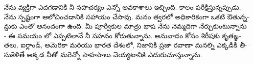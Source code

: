 \documentclass[12pt,varwidth]{standalone}
\begin{document}


\begin{telugu} 


నేను వ్యక్తిగా ఎదగడానికి నీ సహచర్యం ఎన్నో అవకాశాలు ఇచ్చింది. కాలం పరీక్షిస్తున్నప్పుడు, నేను స్పష్టంగా ఆలోచించడానికి సహాయం చేసావు. మనం త్వరలో అధికారికంగా ఒకటి ఔతున్నన్దుకు ఎంతో ఆనందంగా ఉంది. మీ పూర్వీకుల మాత్రు భాష నేను నెమ్మదిగా నేర్చుకుంటున్నాను - ఈ సమయం లో ఎప్పటిలానే నీ సహనం కోరుతున్నాను. అనువాదం కోసం శిరీషకు కృతఙ్ఞతలు. ఐర్లాండ్, అమెరికా మరియు భారత దేశంలో, నిజానికి ప్రజా రవాణా మనల్ని ఎక్కడికి తీసుకెళితే అక్కడ నీతో మరెన్నో సాహసాలు చెయ్యటానికి ఎదురుచూస్తున్నాను.

\end{telugu}
\end{document}
